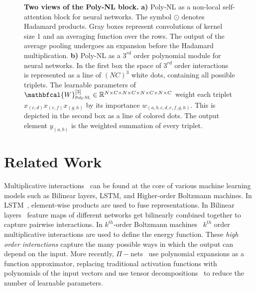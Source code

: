 \documentclass[10pt,twocolumn,letterpaper]{article}
\begin{document}
\begin{figure*}[t]
  \hspace*{0.5cm}
     \vspace{-0.3cm}
    \caption{ \textbf{Two views of the Poly-NL block.} \textbf{ a)} Poly-NL as a non-local self-attention block for neural networks. The symbol $\odot$ denotes Hadamard products. Gray boxes represent convolutions of kernel size 1 and an averaging function over the rows. The output of the average pooling undergoes an expansion before the Hadamard multiplication.  \textbf{b)} Poly-NL as a $3^{rd}$ order polynomial module for neural networks. In the first box the space of $3^{rd}$ order interactions is represented as a line of $(NC)^3$ white dots, containing all possible triplets. The learnable parameters of $\mathbfcal{W}^{[3]}_{{\scalebox{.6}[.6]{Poly-NL}}} \in \mathbb{R}^{N \times C \times N \times C \times N \times C \times N \times C} $ weight each triplet $x_{(c,d)} x_{(e,f)} x_{(g,h)}$ by its importance $w_{(a,b,c,d,e,f,g,h)}$. This is depicted in the second box as a line of colored dots. The output element $y_{(a,b)}$ is the weighted summation of every triplet.  \vspace{-0.3cm}}
\label{fig:iiipoly}
\hspace*{-1cm}
\end{figure*}


\section{Related Work}
Multiplicative interactions~\cite{jayakumar2019multiplicative} can be found at the core of various machine learning models such as Bilinear layers, LSTM, and Higher‐order Boltzmann machines. In LSTM~\cite{hochreiter1997long, krause2016multiplicative}, element-wise products are used to fuse representations. In Bilinear layers~\cite{tenenbaum2000separating, carreira2012semantic, lin2015bilinear, yu2018hierarchical} feature maps of different networks get bilinearly combined together to capture pairwise interactions. In $k^{th}$‐order Boltzmann machines~\cite{memisevic2007unsupervised,memisevic2010learning,sejnowski1986higher} $k^{th}$ order multiplicative interactions are used to define the energy function. These \textit{high order interactions} capture the many possible ways in which the output can depend on the input. More recently, $\Pi-$nets~\cite{chrysos2020p} use polynomial expansions as a function approximator, replacing traditional activation functions with polynomials of the input vectors and use tensor decompositions~\cite{kolda2009tensor} to reduce the number of learnable parameters. 
 
\end{document}
